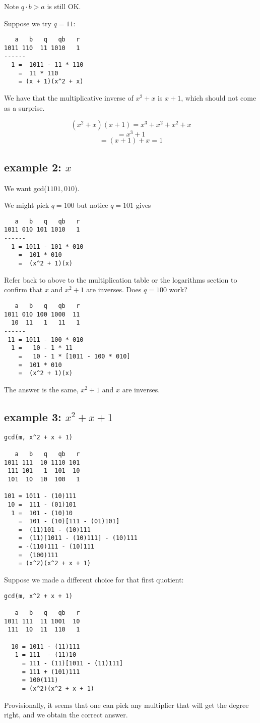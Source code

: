 \documentclass[11pt, oneside]{article}
\begin{document}
Note $q \cdot b > a$ is still OK.

Suppose we try $q = 11$:
\begin{verbatim}
   a   b   q   qb   r
1011 110  11 1010   1
------
  1 =  1011 - 11 * 110
    =  11 * 110
    = (x + 1)(x^2 + x)
\end{verbatim}

We have that the multiplicative inverse of $x^2 + x$ is $x + 1$, which should not come as a surprise.

\[ (x^2 + x)(x + 1) = x^3 + x^2 + x^2 + x \]
\[ = x^3 + 1 \]
\[ = (x + 1) + x = 1 \]

\subsection*{example 2: $x$}
We want gcd($1101, 010$).  

We might pick $q = 100$ but notice $q = 101$ gives
\begin{verbatim}
   a   b   q   qb   r
1011 010 101 1010   1
------
  1 = 1011 - 101 * 010
    =  101 * 010
    =  (x^2 + 1)(x)
\end{verbatim}

Refer back to above to the multiplication table or the logarithms section to confirm that $x$ and $x^2 + 1$ are inverses.  Does $q = 100$ work?

\begin{verbatim}
   a   b   q   qb   r
1011 010 100 1000  11
  10  11   1   11   1
------
 11 = 1011 - 100 * 010
  1 =   10 - 1 * 11
    =   10 - 1 * [1011 - 100 * 010]
    =  101 * 010
    =  (x^2 + 1)(x)
\end{verbatim}

The answer is the same, $x^2 + 1$ and $x$ are inverses.

\subsection*{example 3: $x^2 + x + 1$}

\begin{verbatim}
gcd(m, x^2 + x + 1)

   a   b   q   qb   r
1011 111  10 1110 101
 111 101   1  101  10
 101  10  10  100   1

101 = 1011 - (10)111
 10 =  111 - (01)101
  1 =  101 - (10)10
    =  101 - (10)[111 - (01)101]
    =  (11)101 - (10)111
    =  (11)[1011 - (10)111] - (10)111
    = -(110)111 - (10)111
    =  (100)111
    = (x^2)(x^2 + x + 1)
\end{verbatim}

Suppose we made a different choice for that first quotient:

\begin{verbatim}
gcd(m, x^2 + x + 1)

   a   b   q   qb   r
1011 111  11 1001  10
 111  10  11  110   1

  10 = 1011 - (11)111
   1 = 111  - (11)10
     = 111 - (11)[1011 - (11)111]
     = 111 + (101)111 
     = 100(111)
     = (x^2)(x^2 + x + 1)
\end{verbatim}

Provisionally, it seems that one can pick any multiplier that will get the degree right, and we obtain the correct answer.
\end{document}
